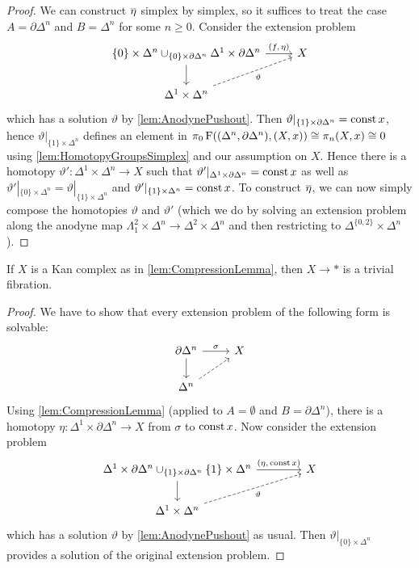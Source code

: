 \begin{proof}
	We can construct $\ov\eta$ simplex by simplex, so it suffices to treat the case $A=\partial\Delta^n$ and $B=\Delta^n$ for some $n\geqslant 0$. Consider the extension problem
	\begin{equation*}
		\begin{tikzcd}
			\{0\}\times\Delta^n\cup_{\{0\}\times\partial\Delta^n}\Delta^1\times\partial\Delta^n\rar["{(f,\,\eta)}"]\dar & X\\
			\Delta^1\times\Delta^n\urar[dashed,"\vartheta"'] & 
		\end{tikzcd}
	\end{equation*}
	which has a solution $\vartheta$ by \cref{lem:AnodynePushout}. Then $\vartheta|_{\{1\}\times\partial\Delta^n}=\operatorname{const} x$, hence $\vartheta|_{\{1\}\times\Delta^n}$ defines an element in $\pi_0\operatorname{F}((\Delta^n,\partial\Delta^n),(X,x))\cong \pi_n(X,x)\cong0$ using \cref{lem:HomotopyGroupsSimplex} and our assumption on $X$. Hence there is a homotopy $\vartheta'\colon \Delta^1\times\Delta^n\rightarrow X$ such that $\vartheta'|_{\Delta^1\times\partial\Delta^n}=\operatorname{const} x$ as well as $\vartheta'|_{\{0\}\times\Delta^n}=\vartheta|_{\{1\}\times\Delta^n}$ and $\vartheta'|_{\{1\}\times\Delta^n}=\operatorname{const} x$. To construct $\ov\eta$, we can now simply compose the homotopies $\vartheta$ and $\vartheta'$ (which we do by solving an extension problem along the anodyne map $\Lambda_1^2\times\Delta^n\rightarrow\Delta^2\times\Delta^n$ and then restricting to $\Delta^{\{0,2\}}\times \Delta^n$).
\end{proof}
\begin{lem}\label{lem:ContractibleKanComplex}
	If $X$ is a Kan complex as in \cref{lem:CompressionLemma}, then $X\rightarrow *$ is a trivial fibration.
\end{lem}
\begin{proof}
	We have to show that every extension problem of the following form is solvable:
	\begin{equation*}
		\begin{tikzcd}
			\partial\Delta^n\rar["\sigma"]\dar& X\\
			\Delta^n\urar[dashed] &
		\end{tikzcd}
	\end{equation*}
	Using \cref{lem:CompressionLemma} (applied to $A=\emptyset$ and $B=\partial\Delta^n$), there is a homotopy $\eta\colon \Delta^1\times\partial\Delta^n\rightarrow X$ from $\sigma$ to $\operatorname{const} x$. Now consider the extension problem
	\begin{equation*}
		\begin{tikzcd}[column sep=4em]
			\Delta^1\times\partial\Delta^n\cup_{\{1\}\times\partial\Delta^n}\{1\}\times\Delta^n\dar\rar["{(\eta,\,\const x)}"] & X\\
			\Delta^1\times\Delta^n\urar[dashed,"\vartheta"',end anchor=202] &
		\end{tikzcd}
	\end{equation*}
	which has a solution $\vartheta$ by \cref{lem:AnodynePushout} as usual. Then $\vartheta|_{\{0\}\times\Delta^n}$ provides a solution of the original extension problem.
\end{proof}
